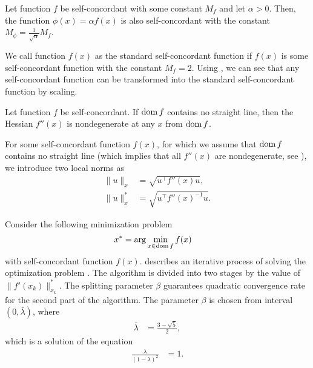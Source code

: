 \begin{corollary}
  Let function $f$ be self-concordant with some constant $M_f$ and let $\alpha > 0$. Then, the function $\phi(x) = \alpha f(x)$ is also self-concordant with the constant $M_\phi = \frac{1}{\sqrt{\alpha}}M_f$.
\end{corollary}

We call function $f(x)$ as the standard self-concordant function if $f(x)$ is some self-concordant function with the constant $M_f = 2$. Using , we can see that any self-concordant function can be transformed into the standard self-concordant function by scaling.

\begin{theorem}
  Let function $f$ be self-concordant. If $\operatorname{dom} f$ contains no straight line, then the Hessian $f''(x)$ is nondegenerate at any $x$ from $\operatorname{dom} f$.
\end{theorem}

For some self-concordant function $f(x)$, for which we assume that $\operatorname{dom} f$ contains no straight line (which implies that all $f''(x)$ are nondegenerate, see ), we introduce two local norms as
\begin{align}
  \| u \|_x &= \sqrt{u^\top f''(x) u},\\
  \| u \|_x^* &= \sqrt{u^\top f''(x)^{-1} u}.
\end{align}

Consider the following minimization problem
\begin{align}
  x^* &= \arg\min_{x\in\dom f} f(x)\labeleq{SDP:scf:minProblem}
\end{align}
with self-concordant function $f(x)$.
 describes an iterative process of solving the optimization problem .
The algorithm is divided into two stages by the value of $\|f'(x_k)\|_{x_k}^*$.
The splitting parameter $\beta$ guarantees quadratic convergence rate for the second part of the algorithm. The parameter $\beta$ is chosen from interval $(0, \bar{\lambda})$, where
\begin{align}
  \bar{\lambda} &= \frac{3 - \sqrt{5}}{2},
\end{align}
which is a solution of the equation
\begin{align}
  \frac{\lambda}{(1-\lambda)^2} &= 1.
\end{align}

